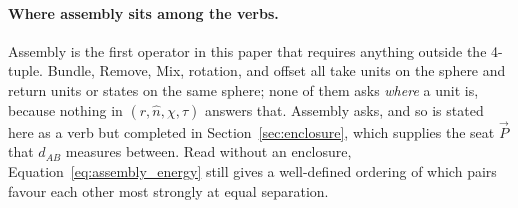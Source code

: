 \documentclass[12pt, a4paper]{article}
\begin{document}
\paragraph{Where assembly sits among the verbs.}
Assembly is the first operator in this paper that requires anything
outside the 4-tuple. Bundle, Remove, Mix, rotation, and offset all
take units on the sphere and return units or states on the same
sphere; none of them asks \emph{where} a unit is, because nothing in
$(r,\hat n,\chi,\tau)$ answers that. Assembly asks, and so is stated
here as a verb but completed in Section~\ref{sec:enclosure}, which
supplies the seat $\vec P$ that $d_{AB}$ measures between. Read
without an enclosure, Equation~\eqref{eq:assembly_energy} still
gives a well-defined ordering of which pairs favour each other most
strongly at equal separation.
\end{document}
